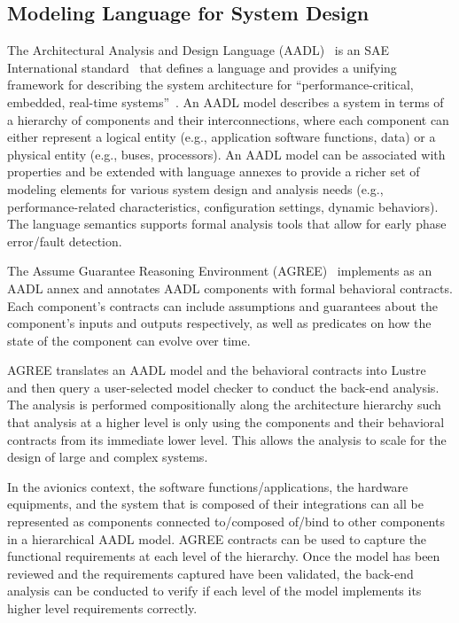 \subsection{Modeling Language for System Design}
\label{subsec:aadl-agree}
The Architectural Analysis and Design Language (AADL)~\cite{FeilerModelBasedEngineering2012} is an SAE International standard~\cite{AADL_Standard} that defines a language and provides a unifying framework for describing the system architecture for ``performance-critical, embedded, real-time systems''~\cite{AADL_Standard}. An AADL model describes a system in terms of a hierarchy of components and their interconnections, where each component can either represent a logical entity (e.g., application software functions, data) or a physical entity (e.g., buses, processors). An AADL model can be associated with properties and be extended with language annexes to provide a richer set of modeling elements for various system design and analysis needs (e.g., performance-related characteristics, configuration settings, dynamic behaviors). The language semantics supports formal analysis tools that allow for early phase error/fault detection.

The Assume Guarantee Reasoning
Environment (AGREE)~\cite{NFM2012:CoGaMiWhLaLu} implements as an AADL annex and annotates AADL components with formal behavioral contracts. Each component's contracts can include assumptions and guarantees about the component's inputs and outputs respectively, as well as predicates on how the state of the component can evolve over time.

AGREE translates an AADL model and the behavioral contracts into Lustre~\cite{Halbwachs91:IEEE} and then query a user-selected
model checker to conduct the back-end analysis. The analysis is performed compositionally along the architecture hierarchy such that analysis at a higher level is only using the components and their behavioral contracts from its immediate lower level. This allows the analysis to scale for the design of large and complex systems. 

In the avionics context, the software functions/applications, the hardware equipments, and the system that is composed of their integrations can all be represented as components connected to/composed of/bind to other components in a hierarchical AADL model. AGREE contracts can be used to capture the functional requirements at each level of the hierarchy. Once the model has been reviewed and the requirements captured have been validated, the back-end analysis can be conducted to verify if each level of the model implements its higher level requirements correctly.

